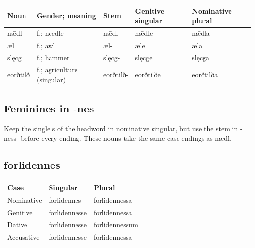 \par\begingroup
\fontsize{10.5}{13.2}\selectfont
\setlength{\LTleft}{0pt}\setlength{\LTright}{\fill}
\noindent
\begin{tabular}{@{}>{\raggedright\arraybackslash}p{17.76mm}>{\raggedright\arraybackslash}p{31.52mm}>{\raggedright\arraybackslash}p{17.76mm}>{\raggedright\arraybackslash}p{22.37mm}>{\raggedright\arraybackslash}p{23.35mm}@{}}
\toprule
\textbf{Noun} & \textbf{Gender; meaning} & \textbf{Stem} & \textbf{Genitive singular} & \textbf{Nominative plural} \\
\midrule
nǣdl & f.; needle & nǣdl- & nǣdle & nǣdla \\
ǣl & f.; awl & ǣl- & ǣle & ǣla \\
slęcg & f.; hammer & slęcg- & slęcge & slęcga \\
eorðtilð & f.; agriculture (singular) & eorðtilð- & eorðtilðe & eorðtilða \\
\bottomrule
\end{tabular}
\par\endgroup

\subsection*{Feminines in -nes}

Keep the single s of the headword in nominative singular, but use the stem in -ness- before every ending. These nouns take the same case endings as nǣdl.

\subsection*{forlidennes}

\par\begingroup
\fontsize{10.5}{13.2}\selectfont
\setlength{\LTleft}{0pt}\setlength{\LTright}{\fill}
\noindent
\begin{tabular}{@{}>{\raggedright\arraybackslash}p{31.99mm}>{\raggedright\arraybackslash}p{41.59mm}>{\raggedright\arraybackslash}p{44.79mm}@{}}
\toprule
\textbf{Case} & \textbf{Singular} & \textbf{Plural} \\
\midrule
Nominative & forlidennes & forlidennessa \\
Genitive & forlidennesse & forlidennessa \\
Dative & forlidennesse & forlidennessum \\
Accusative & forlidennesse & forlidennessa \\
\bottomrule
\end{tabular}
\par\endgroup

